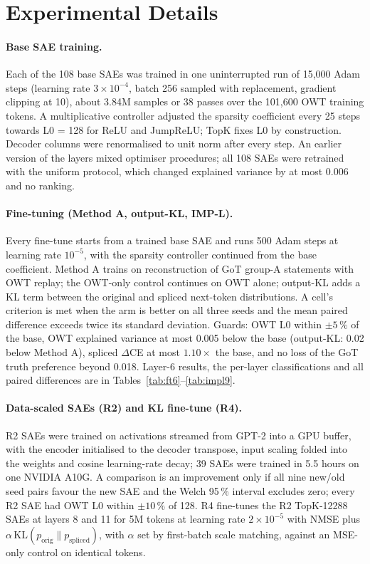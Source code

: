 \section{Experimental Details}\label{app:details}

\paragraph{Base SAE training.} Each of the 108 base SAEs was trained in one uninterrupted run of 15{,}000 Adam steps
(learning rate $3\times10^{-4}$, batch 256 sampled with replacement, gradient clipping at 10), about 3.84M samples or 38
passes over the 101{,}600 OWT training tokens. A multiplicative controller adjusted the sparsity coefficient every 25
steps towards L0 = 128 for ReLU and JumpReLU; TopK fixes L0 by construction. Decoder columns were renormalised to unit
norm after every step. An earlier version of the layers mixed optimiser procedures; all 108 SAEs were retrained with the
uniform protocol, which changed explained variance by at most 0.006 and no ranking.

\paragraph{Fine-tuning (Method A, output-KL, IMP-L).} Every fine-tune starts from a trained base SAE and runs 500 Adam
steps at learning rate $10^{-5}$, with the sparsity controller continued from the base coefficient. Method A trains on
reconstruction of GoT group-A statements with OWT replay; the OWT-only control continues on OWT alone; output-KL adds a
KL term between the original and spliced next-token distributions. A cell's criterion is met when the arm is better on
all three seeds and the mean paired difference exceeds twice its standard deviation. Guards: OWT L0 within $\pm5\,\%$ of
the base, OWT explained variance at most 0.005 below the base (output-KL: 0.02 below Method A), spliced $\Delta$CE at most
$1.10\times$ the base, and no loss of the GoT truth preference beyond 0.018. Layer-6 results, the per-layer
classifications and all paired differences are in Tables~\ref{tab:ft6}--\ref{tab:impl9}.

\paragraph{Data-scaled SAEs (R2) and KL fine-tune (R4).} R2 SAEs were trained on activations streamed from GPT-2 into
a GPU buffer, with the encoder initialised to the decoder transpose, input scaling folded into the weights and cosine
learning-rate decay; 39 SAEs were trained in 5.5 hours on one NVIDIA A10G. A comparison is an improvement only if all
nine new/old seed pairs favour the new SAE and the Welch 95\,\% interval excludes zero; every R2 SAE had OWT L0 within
$\pm10\,\%$ of 128. R4 fine-tunes the R2 TopK-12288 SAEs at layers 8 and 11 for 5M tokens at learning rate
$2\times10^{-5}$ with NMSE plus $\alpha\,\mathrm{KL}(p_{\text{orig}}\|p_{\text{spliced}})$, with $\alpha$ set by first-batch
scale matching, against an MSE-only control on identical tokens.

